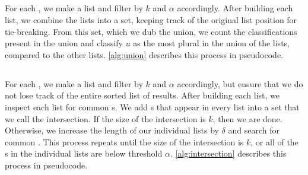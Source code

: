 \subsection{\runion{}}
For each \compfunc{}, we make a \knnlong{} list and filter by $k$ and $\alpha$ accordingly.
After building each \knnlong{} list, we combine the lists into a set, keeping track of the original list position for tie-breaking.
From this set, which we dub the union, we count the classifications present in the union and classify $u$ as the most plural in the union of the lists, compared to the other lists.
\autoref{alg:union} describes this process in pseudocode.


\subsection{\rintersect{}}
For each \compfunc{}, we make a \knnlong{} list and filter by $k$ and $\alpha$ accordingly, but ensure that we do not lose track of the entire sorted list of results.
After building each \knnlong{} list, we inspect each list for common \isol{}s.
We add \isol{}s that appear in every list into a set that we call the intersection.
If the size of the intersection is $k$, then we are done.
Otherwise, we increase the length of our individual lists by $\delta$ and search for common \isol{}.
This process repeats until the size of the intersection is $k$, or all of the \isol{}s in the individual lists are below threshold $\alpha$.
\autoref{alg:intersection} describes this process in pseudocode.
